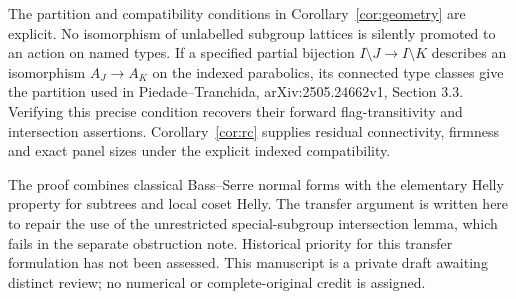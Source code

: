 The partition and compatibility conditions in Corollary~\ref{cor:geometry}
are explicit. No isomorphism of unlabelled subgroup lattices is silently
promoted to an action on named types. If a specified partial bijection
$I\setminus J\to I\setminus K$ describes an isomorphism
$A_J\to A_K$ on the indexed parabolics, its connected type classes
give the partition used in Piedade--Tranchida, arXiv:2505.24662v1,
Section 3.3. Verifying this precise condition recovers their forward
flag-transitivity and intersection assertions. Corollary~\ref{cor:rc}
supplies residual connectivity, firmness and exact panel sizes under
the explicit indexed compatibility.

The proof combines classical Bass--Serre normal forms with the elementary
Helly property for subtrees and local coset Helly. The transfer argument
is written here to repair the use of the unrestricted special-subgroup
intersection lemma, which fails in the separate obstruction note.
Historical priority for this transfer formulation has not been assessed.
This manuscript is a private draft awaiting distinct review; no numerical
or complete-original credit is assigned.

